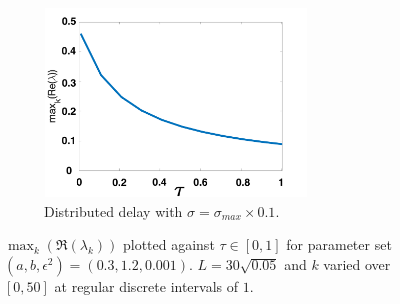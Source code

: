 \begin{figure}[H]
\begin{subfigure}[b]{0.45\textwidth}
        \centering
        \includegraphics[width=7cm,height=5cm]{p1sigmax10.png}
        \caption{Distributed delay with $\sigma=\sigma_{max}\times0.1$.}
        \label{}
    \end{subfigure}
    \caption{$\max_k(\Re(\lambda_k))$ plotted against $\tau\in[0,1]$ for parameter set $(a,b,\epsilon^2)=(0.3,1.2,0.001)$. $L=30\sqrt{0.05}$ and $k$ varied over $[0,50]$ at regular discrete intervals of $1$.}
    \label{fig:p1}
\end{figure}
